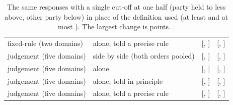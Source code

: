 \begin{table}[t]
\begin{tabular}{llcc}
fixed-rule (two domains) & alone, told a precise rule & \ToldRuleReasoningFixedRule{} [\ToldRuleReasoningFixedRuleLo{}, \ToldRuleReasoningFixedRuleHi{}] & \CutoffHalfToldRuleReasoningFixedRule{} [\CutoffHalfToldRuleReasoningFixedRuleLo{}, \CutoffHalfToldRuleReasoningFixedRuleHi{}] \\
judgement (five domains) & side by side (both orders pooled) & \SideBySideReasoningJudgement{} [\SideBySideReasoningJudgementLo{}, \SideBySideReasoningJudgementHi{}] & \CutoffHalfSideBySideReasoningJudgement{} [\CutoffHalfSideBySideReasoningJudgementLo{}, \CutoffHalfSideBySideReasoningJudgementHi{}] \\
judgement (five domains) & alone & \AloneReasoningJudgement{} [\AloneReasoningJudgementLo{}, \AloneReasoningJudgementHi{}] & \CutoffHalfAloneReasoningJudgement{} [\CutoffHalfAloneReasoningJudgementLo{}, \CutoffHalfAloneReasoningJudgementHi{}] \\
judgement (five domains) & alone, told in principle & \ToldPrincipleReasoningJudgement{} [\ToldPrincipleReasoningJudgementLo{}, \ToldPrincipleReasoningJudgementHi{}] & \CutoffHalfToldPrincipleReasoningJudgement{} [\CutoffHalfToldPrincipleReasoningJudgementLo{}, \CutoffHalfToldPrincipleReasoningJudgementHi{}] \\
judgement (five domains) & alone, told a precise rule & \ToldRuleReasoningJudgement{} [\ToldRuleReasoningJudgementLo{}, \ToldRuleReasoningJudgementHi{}] & \CutoffHalfToldRuleReasoningJudgement{} [\CutoffHalfToldRuleReasoningJudgementLo{}, \CutoffHalfToldRuleReasoningJudgementHi{}] \\
\bottomrule
\end{tabular}
\caption{The same responses with a single cut-off at one half (party held to less above, other party below) in place of the definition used (at least \SplitHigh{} and at most \SplitLow{}). The largest change is \CutoffMaxChange{} points. \IntervalsNote{}.}
\label{tab:cutoff}
\end{table}
